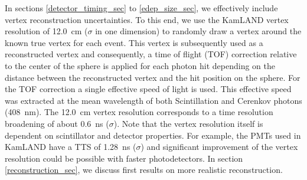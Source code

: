 \documentclass[aps,prc,twocolumn,groupedaddress,showpacs,amsmath,amssymb,floatfix,superscriptaddress]{revtex4}
\begin{document}
In sections \ref{detector_timing_sec} to \ref{edep_size_sec}, we effectively include vertex reconstruction uncertainties. To this end, we use the KamLAND vertex resolution of 12.0~cm \cite{tbd} ($\sigma$ in one dimension) to randomly draw a vertex around the known true vertex for each event. This vertex is subsequently used as a reconstructed vertex and consequently, a time of flight (TOF) correction relative to the center of the sphere is applied for each photon hit depending on the distance between the reconstructed vertex and the hit position on the sphere. For the TOF correction a single effective speed of light is used. This effective speed was extracted at the mean wavelength of both Scintillation and Cerenkov photons (408~nm). The 12.0~cm vertex resolution corresponds to a time resolution broadening of about 0.6~ns ($\sigma$). Note that the vertex resolution itself is dependent on scintillator and detector properties. For example, the PMTs used in KamLAND have a TTS of 1.28~ns ($\sigma$) and significant improvement of the vertex resolution could be possible with faster photodetectors. In section \ref{reconstruction_sec}, we discuss first results on more realistic reconstruction.
\end{document}
